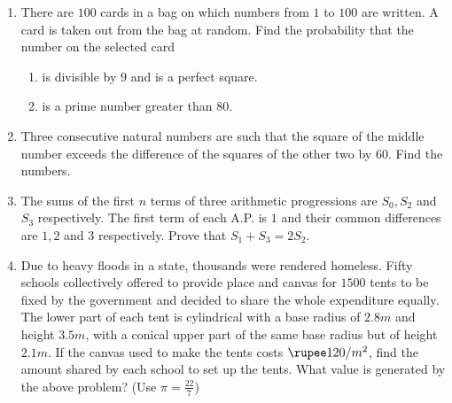\documentclass{article}
\begin{document}
\begin{enumerate}
    \item There are $100$ cards in a bag on which numbers from $1$ to $100$ are written. A card is taken out from the bag at random. Find the probability that the number on the selected card
    \begin{enumerate}
        \item is divisible by $9$ and is a perfect square.
        \item is a prime number greater than $80$.
    \end{enumerate}

    \item Three consecutive natural numbers are such that the square of the middle number exceeds the difference of the squares of the other two by $60$. Find the numbers.

    \item The sums of the first $n$ terms of three arithmetic progressions are $S_0, S_2$ and $S_3$ respectively. The first term of each A.P. is $1$ and their common differences are $1, 2$ and $3$ respectively. Prove that $S_1 + S_3 = 2S_2$.

    \item Due to heavy floods in a state, thousands were rendered homeless. Fifty schools collectively offered to provide place and canvas for $1500$ tents to be fixed by the government and decided to share the whole expenditure equally. The lower part of each tent is cylindrical with a base radius of $2.8 m$ and height $3.5 m$, with a conical upper part of the same base radius but of height $2.1 m$. If the canvas used to make the tents costs $\rupee 120/ m^2$, find the amount shared by each school to set up the tents. What value is generated by the above problem? (Use $\pi = \frac{22}{7} $)


\end{enumerate}
\end{document}
